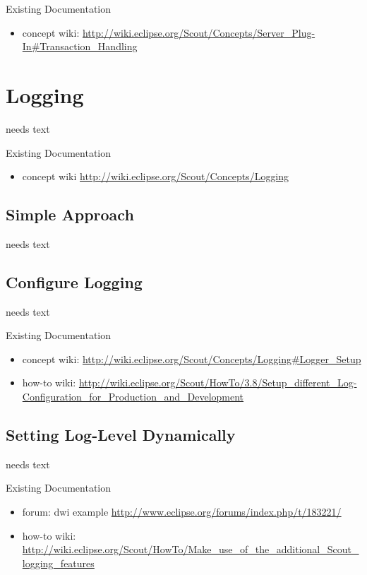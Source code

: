 \documentclass[a4paper,10pt,twoside]{book}
\begin{document}
\noindent Existing Documentation
\begin{itemize}
  \item concept wiki: \url{http://wiki.eclipse.org/Scout/Concepts/Server_Plug-In#Transaction_Handling}
\end{itemize}

\chapter{Logging}
needs text

\noindent Existing Documentation
\begin{itemize}
  \item concept wiki \url{http://wiki.eclipse.org/Scout/Concepts/Logging}
\end{itemize}

\section{Simple Approach}
needs text
  
\section{Configure Logging}
needs text

\noindent Existing Documentation
\begin{itemize}
  \item concept wiki: \url{http://wiki.eclipse.org/Scout/Concepts/Logging#Logger_Setup}
  \item how-to wiki: \url{http://wiki.eclipse.org/Scout/HowTo/3.8/Setup_different_Log-Configuration_for_Production_and_Development}
\end{itemize}

\section{Setting Log-Level Dynamically}
needs text

\noindent Existing Documentation
\begin{itemize}
  \item forum: dwi example \url{http://www.eclipse.org/forums/index.php/t/183221/}
  \item how-to wiki: \url{http://wiki.eclipse.org/Scout/HowTo/Make_use_of_the_additional_Scout_logging_features}
\end{itemize}
\end{document}

